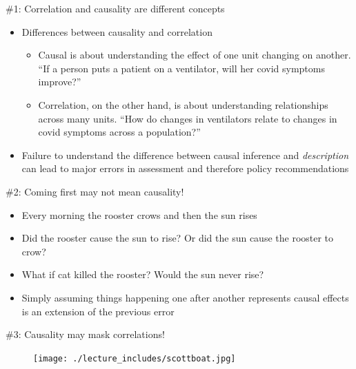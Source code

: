 \documentclass{beamer}
\begin{document}
\begin{frame}{\#1: Correlation and causality are different concepts}

  \begin{itemize}
  	\item Differences between causality and correlation
		\begin{itemize}
	    \item Causal is about understanding the effect of one unit changing on another. ``If a person  puts a patient on a ventilator, will her covid symptoms improve?''
	    \item Correlation, on the other hand, is about understanding relationships across many units. ``How do changes in ventilators relate to changes in covid symptoms across a population?''
	    	\end{itemize}
	\item Failure to understand the difference between causal inference and \emph{description} can lead to major errors in assessment and therefore policy recommendations
  \end{itemize}  
\end{frame}



\begin{frame}{\#2: Coming first may not mean causality!}

  \begin{itemize}
    \item Every morning the rooster crows and then the sun rises
    \item Did the rooster cause the sun to rise? Or did the sun cause the rooster to crow?
    \item What if cat killed the rooster?  Would the sun never rise?
    \item Simply assuming things happening one after another represents causal effects is an extension of the previous error
  \end{itemize}

\end{frame}

\begin{frame}{\#3: Causality may mask correlations!}

  \begin{figure}
    \centering
    \texttt{[image: ./lecture\_includes/scottboat.jpg]}
  \end{figure}

\end{frame}
\end{document}
